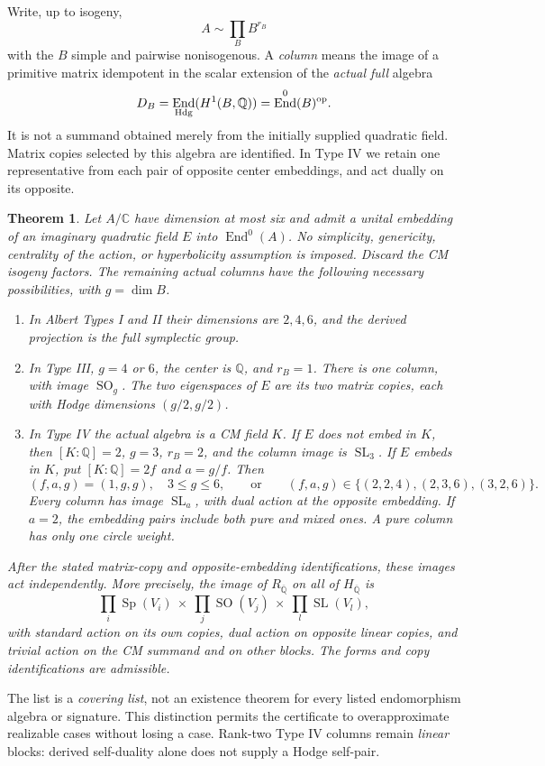 \documentclass[11pt]{article}
\newcommand{\Q}{\mathbb Q}
\newcommand{\C}{\mathbb C}
\newcommand{\kk}{{\overline{\mathbb Q}}}
\DeclareMathOperator{\End}{End}
\DeclareMathOperator{\SL}{SL}
\DeclareMathOperator{\Sp}{Sp}
\DeclareMathOperator{\SO}{SO}
\newtheorem{theorem}{Theorem}
\theoremstyle{remark}
\begin{document}
Write, up to isogeny,
\[
 A\sim\prod_B B^{r_B}
\]
with the $B$ simple and pairwise nonisogenous. A \emph{column} means the
image of a primitive matrix idempotent in the scalar extension of the
\emph{actual full} algebra
\[
 D_B=\End_{\rm Hdg}(H^1(B,\Q))=\End^0(B)^{\rm op}.
\]
It is not a summand obtained merely from the initially supplied quadratic
field. Matrix copies selected by this algebra are identified. In Type IV
we retain one representative from each pair of opposite center embeddings,
and act dually on its opposite.

\begin{theorem}\label{thm:main}
Let $A/\C$ have dimension at most six and admit a unital embedding of an
imaginary quadratic field $E$ into $\End^0(A)$. No simplicity, genericity,
centrality of the action, or hyperbolicity assumption is imposed.
Discard the CM isogeny factors. The remaining actual columns have the
following necessary possibilities, with $g=\dim B$.
\begin{enumerate}
\item In Albert Types I and II their dimensions are $2,4,6$, and the
derived projection is the full symplectic group.
\item In Type III, $g=4$ or $6$, the center is $\Q$, and $r_B=1$.
There is one column, with image $\SO_g$. The two eigenspaces of $E$
are its two matrix copies, each with Hodge dimensions $(g/2,g/2)$.
\item In Type IV the actual algebra is a CM field $K$.
If $E$ does not embed in $K$, then $[K:\Q]=2$, $g=3$, $r_B=2$,
and the column image is $\SL_3$.
If $E$ embeds in $K$, put $[K:\Q]=2f$ and $a=g/f$. Then
\[
 (f,a,g)=(1,g,g),\quad 3\leq g\leq6,
 \qquad\text{or}\qquad
 (f,a,g)\in\{(2,2,4),(2,3,6),(3,2,6)\}.
 \]
Every column has image $\SL_a$, with dual action at the opposite
embedding. If $a=2$, the embedding pairs include both pure and mixed
ones. A pure column has only one circle weight.
\end{enumerate}
After the stated matrix-copy and opposite-embedding identifications,
these images act independently. More precisely, the image of $R_\kk$
on all of $H_\kk$ is
\[
 \prod_i\Sp(V_i)\ \times\ \prod_j\SO(V_j)\
 \times\ \prod_l\SL(V_l),
 \tag{1}\label{eq:product}
\]
with standard action on its own copies, dual action on opposite linear
copies, and trivial action on the CM summand and on other blocks.
The forms and copy identifications are admissible.
\end{theorem}

The list is a \emph{covering list}, not an existence theorem for every
listed endomorphism algebra or signature. This distinction permits the
certificate to overapproximate realizable cases without losing a case.
Rank-two Type IV columns remain \emph{linear} blocks: derived self-duality
alone does not supply a Hodge self-pair.
\end{document}

